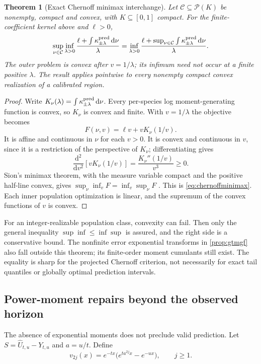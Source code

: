 \documentclass[11pt]{article}
\numberwithin{equation}{section}
\newtheorem{theorem}{Theorem}[section]
\theoremstyle{definition}
\theoremstyle{remark}
\newcommand{\Prob}{\mathcal P}
\newcommand{\Ccal}{\mathcal C}
\newcommand{\dd}{\,\mathrm d}
\begin{document}
\begin{theorem}[Exact Chernoff minimax interchange]\label{thm:chernoffminimax}
Let $\Ccal\subseteq\Prob(K)$ be nonempty, compact and convex, with $K\subseteq[0,1]$ compact. For the finite-coefficient kernel above and $\ell>0$,
\begin{equation}\label{eq:chernoffminimax}
 \sup_{\nu\in\Ccal}\inf_{\lambda>0}
 \frac{\ell+\int\kappa^{\rm pred}_{\pm\lambda}\dd\nu}{\lambda}
 =\inf_{\lambda>0}
 \frac{\ell+\sup_{\nu\in\Ccal}\int\kappa^{\rm pred}_{\pm\lambda}\dd\nu}{\lambda}.
\end{equation}
The outer problem is convex after $v=1/\lambda$; its infimum need not occur at a finite positive $\lambda$. The result applies pointwise to every nonempty compact convex realization of a calibrated region.
\end{theorem}
\begin{proof}
Write $K_\nu(\lambda)=\int\kappa^{\rm pred}_{\pm\lambda}\dd\nu$. Every per-species log moment-generating function is convex, so $K_\nu$ is convex and finite. With $v=1/\lambda$ the objective becomes
\[
 F(\nu,v)=\ell v+vK_\nu(1/v).
\]
It is affine and continuous in $\nu$ for each $v>0$. It is convex and continuous in $v$, since it is a restriction of the perspective of $K_\nu$; differentiating gives
\[
 \frac{\mathrm d^2}{\mathrm dv^2}[vK_\nu(1/v)]
 =\frac{K_\nu''(1/v)}{v^3}\ge0.
\]
Sion's minimax theorem, with the measure variable compact and the positive half-line convex, gives $\sup_\nu\inf_vF=\inf_v\sup_\nu F$ \cite[p.~174]{Sion1958}. This is \eqref{eq:chernoffminimax}. Each inner population optimization is linear, and the supremum of the convex functions of $v$ is convex.
\end{proof}
For an integer-realizable population class, convexity can fail. Then only the general inequality $\sup\inf\le\inf\sup$ is assured, and the right side is a conservative bound. The nonfinite error exponential transforms in \cref{prop:gtmgf} also fall outside this theorem; its finite-order moment cumulants still exist. The equality is sharp for the projected Chernoff criterion, not necessarily for exact tail quantiles or globally optimal prediction intervals.

\subsection{Power-moment repairs beyond the observed horizon}\label{subsec:gtmoments}
The absence of exponential moments does not preclude valid prediction. Let $S=\widehat U_{t,u}-Y_{t,u}$ and $a=u/t$. Define
\begin{equation}\label{eq:gtevenmoments}
 v_{2j}(x)=e^{-tx}\bigl(e^{t a^{2j}x}-e^{-ux}\bigr),\qquad j\ge1.
\end{equation}
\end{document}
